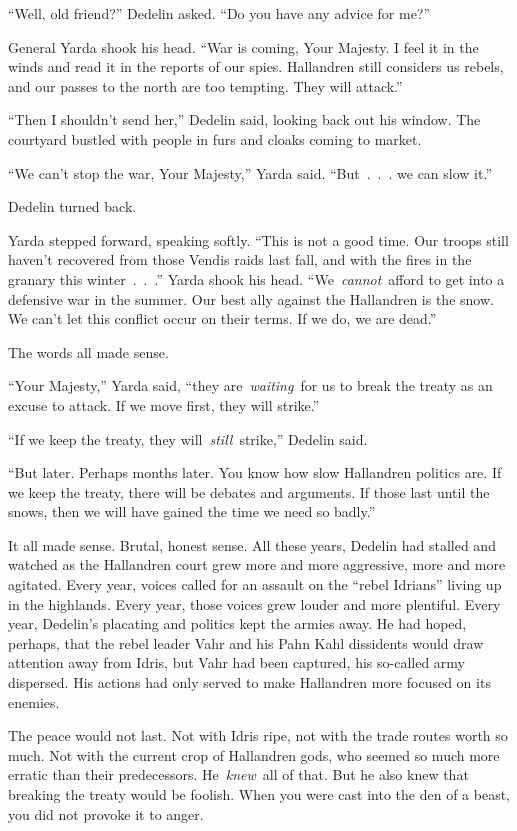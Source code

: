 “Well, old friend?” Dedelin asked. “Do you have any advice for me?”

General Yarda shook his head. “War is coming, Your Majesty. I feel it in the winds and read it in the reports of our spies. Hallandren still considers us rebels, and our passes to the north are too tempting. They will attack.”

“Then I shouldn’t send her,” Dedelin said, looking back out his window. The courtyard bustled with people in furs and cloaks coming to market.

“We can’t stop the war, Your Majesty,” Yarda said. “But~.~.~. we can slow it.”

Dedelin turned back.

Yarda stepped forward, speaking softly. “This is not a good time. Our troops still haven’t recovered from those Vendis raids last fall, and with the fires in the granary this winter~.~.~.” Yarda shook his head. “We~\textit{cannot}~afford to get into a defensive war in the summer. Our best ally against the Hallandren is the snow. We can’t let this conflict occur on their terms. If we do, we are dead.”

The words all made sense.

“Your Majesty,” Yarda said, “they are~\textit{waiting}~for us to break the treaty as an excuse to attack. If we move first, they will strike.”

“If we keep the treaty, they will~\textit{still}~strike,” Dedelin said.

“But later. Perhaps months later. You know how slow Hallandren politics are. If we keep the treaty, there will be debates and arguments. If those last until the snows, then we will have gained the time we need so badly.”

It all made sense. Brutal, honest sense. All these years, Dedelin had stalled and watched as the Hallandren court grew more and more aggressive, more and more agitated. Every year, voices called for an assault on the “rebel Idrians” living up in the highlands. Every year, those voices grew louder and more plentiful. Every year, Dedelin’s placating and politics kept the armies away. He had hoped, perhaps, that the rebel leader Vahr and his Pahn Kahl dissidents would draw attention away from Idris, but Vahr had been captured, his so-called army dispersed. His actions had only served to make Hallandren more focused on its enemies.

The peace would not last. Not with Idris ripe, not with the trade routes worth so much. Not with the current crop of Hallandren gods, who seemed so much more erratic than their predecessors. He~\textit{knew}~all of that. But he also knew that breaking the treaty would be foolish. When you were cast into the den of a beast, you did not provoke it to anger.

